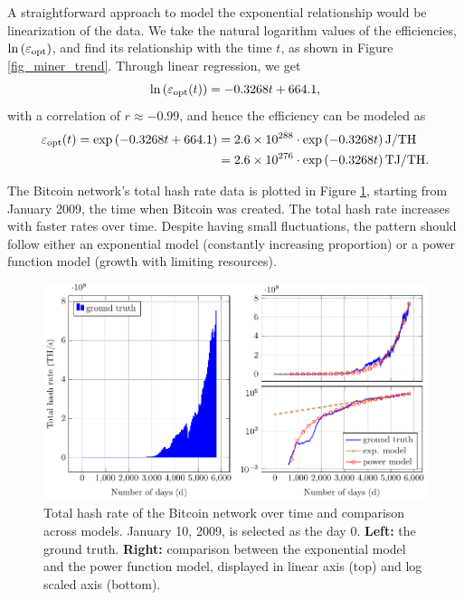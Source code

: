 \documentclass[12pt]{article}
\begin{document}
A straightforward approach to model the exponential relationship would be linearization of the data. We take the natural logarithm values of the efficiencies, $\ln\left(\varepsilon_{\rm opt}\right)$, and find its relationship with the time $t$, as shown in Figure \ref{fig_miner_trend}. Through linear regression, we get
\begin{equation}
	\ln\left(\varepsilon_{\rm opt} (t)\right) = -0.3268t + 664.1,
\end{equation}
with a correlation of $r \approx -0.99$, and hence the efficiency can be modeled as
\begin{align}
	\varepsilon_{\rm opt} (t) = \exp \left(-0.3268t + 664.1\right)
	&= 2.6 \times 10^{288} \cdot \exp \left(-0.3268t\right) {\rm J/TH} \\
	&= 2.6 \times 10^{276} \cdot \exp \left(-0.3268t\right) {\rm TJ/TH}.
	\label{eq_efficiency}
\end{align}

The Bitcoin network's total hash rate data \citep{hashrate} is plotted in Figure \ref{fig_total_hashrate}, starting from January 2009, the time when Bitcoin was created. The total hash rate increases with faster rates over time. Despite having small fluctuations, the pattern should follow either an exponential model (constantly increasing proportion) or a power function model (growth with limiting resources).

\begin{figure}[!t]
	\centering
	\includegraphics{figures/trends/bitcoin_hashrate.pdf}
	\caption{Total hash rate of the Bitcoin network over time and comparison across models. January 10, 2009, is selected as the day 0. \textbf{Left:} the ground truth. \textbf{Right:} comparison between the exponential model and the power function model, displayed in linear axis (top) and log scaled axis (bottom).}
	\label{fig_total_hashrate}
\end{figure}
\end{document}
